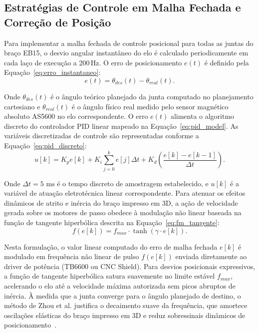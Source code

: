\subsection{Estratégias de Controle em Malha Fechada e Correção de Posição}
\label{subsec:malha_fechada_metodo}

Para implementar a malha fechada de controle posicional para todas as juntas do braço EB15, o desvio angular instantâneo do elo é calculado periodicamente em cada laço de execução a 200\,Hz. O erro de posicionamento $e(t)$ é definido pela Equação~\ref{eq:erro_instantaneo}:
\begin{equation}
\label{eq:erro_instantaneo}
e(t) = \theta_{des}(t) - \theta_{real}(t).
\end{equation}

Onde $\theta_{des}(t)$ é o ângulo teórico planejado da junta computado no planejamento cartesiano e $\theta_{real}(t)$ é o ângulo físico real medido pelo sensor magnético absoluto AS5600 no elo correspondente. O erro $e(t)$ alimenta o algoritmo discreto do controlador PID linear mapeado na Equação~\ref{eq:pid_model}. As variáveis discretizadas de controle são representadas conforme a Equação~\ref{eq:pid_discreto}:
\begin{equation}
\label{eq:pid_discreto}
u[k] = K_p e[k] + K_i \sum_{j=0}^{k} e[j] \Delta t + K_d \left( \frac{e[k] - e[k-1]}{\Delta t} \right).
\end{equation}

Onde $\Delta t = 5\text{ ms}$ é o tempo discreto de amostragem estabelecido, e $u[k]$ é a variável de atuação eletrotécnica linear correspondente. Para atenuar os efeitos dinâmicos de atrito e inércia do braço impresso em 3D, a ação de velocidade gerada sobre os motores de passo obedece à modulação não linear baseada na função de tangente hiperbólica descrita na Equação~\ref{eq:fm_tangente}:
\begin{equation}
\label{eq:fm_tangente}
f(e[k]) = f_{max} \cdot \tanh(\gamma \cdot e[k]).
\end{equation}

Nesta formulação, o valor linear computado do erro de malha fechada $e[k]$ é modulado em frequência não linear de pulso $f(e[k])$ enviada diretamente ao driver de potência (TB6600 ou CNC Shield). Para desvios posicionais expressivos, a função de tangente hiperbólica satura suavemente no limite estável $f_{max}$, acelerando o elo até a velocidade máxima autorizada sem picos abruptos de inércia. À medida que a junta converge para o ângulo planejado de destino, o método de Zhou et al. justifica o decaimento suave da frequência, que amortece oscilações elásticas do braço impresso em 3D e reduz sobressinais dinâmicos de posicionamento~\cite{zhou2023frequency}.

